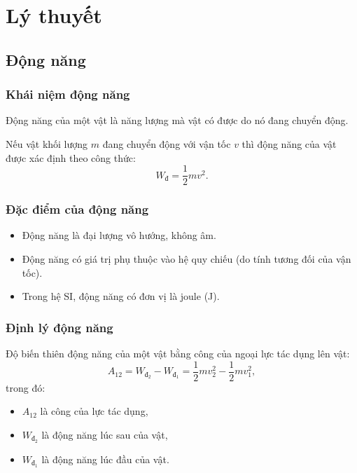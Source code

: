 \setcounter{section}{0}
\section{Lý thuyết}
\subsection{Động năng}
\subsubsection{Khái niệm động năng}
Động năng của một vật là năng lượng mà vật có được do nó đang chuyển động. 

Nếu vật khối lượng $m$ đang chuyển động với vận tốc $v$ thì động năng của vật được xác định theo công thức:
\begin{equation*}
	W_{\text{đ}} =\dfrac{1}{2}mv^2.
\end{equation*}
\subsubsection{Đặc điểm của động năng}
\begin{itemize}
	\item Động năng là đại lượng vô hướng, không âm.
	\item Động năng có giá trị phụ thuộc vào hệ quy chiếu (do tính tương đối của vận tốc).
	\item Trong hệ SI, động năng có đơn vị là joule (J). 
\end{itemize}
\subsubsection{Định lý động năng}
Độ biến thiên động năng của một vật bằng công của ngoại lực tác dụng lên vật:
\begin{equation*}
	A_{12} = W_{\text{đ}_2}-W_{\text{đ}_1}= \dfrac{1}{2}mv^2_2-\dfrac{1}{2}mv^2_1,
\end{equation*}
trong đó:
\begin{itemize}
	\item $A_{12}$ là công của lực tác dụng,
	\item $W_{\text{đ}_2}$ là động năng lúc sau của vật,
	\item $W_{\text{đ}_1}$ là động năng lúc đầu của vật.
\end{itemize} 

